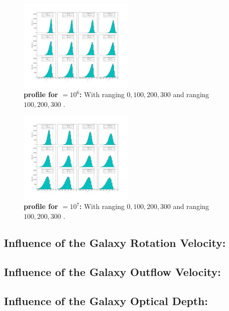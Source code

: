 \documentclass{latex/emulateapj}
\begin{document}
\begin{figure}[h!]
\begin{center}
  \includegraphics[width=0.5\textwidth]{./figures/tau10E6.png}
\end{center}
\caption{\textbf{\lya profile for \tauh$=10^6$:} With \vrot ranging $0,100,200,300$ \kms and \vout ranging $100,200,300$ \kms.
\label{fig:tau10E6}}
\end{figure}

\begin{figure}[h!]
\begin{center}
  \includegraphics[width=0.5\textwidth]{./figures/tau10E7.png}
\end{center}
\caption{\textbf{\lya profile for \tauh$=10^7$:} With \vrot ranging $0,100,200,300$ \kms and \vout ranging $100,200,300$ \kms.
\label{fig:tau10E7}}
\end{figure}

\subsection{Influence of the Galaxy Rotation Velocity: \vrot}


\subsection{Influence of the Galaxy Outflow Velocity: \vout}


\subsection{Influence of the Galaxy Optical Depth: \tauh}
\end{document}
